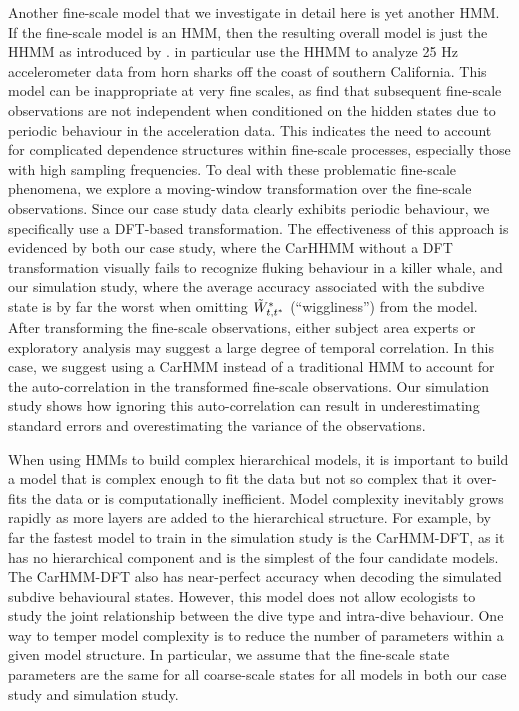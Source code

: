 Another fine-scale model that we investigate in detail here is yet another HMM. If the fine-scale model is an HMM, then the resulting overall model is just the HHMM as introduced by \citet{Barajas:2017}. \citet{Adam:2019} in particular use the HHMM to analyze 25 Hz accelerometer data from horn sharks off the coast of southern California. This model can be inappropriate at very fine scales, as \citet{Adam:2019} find that subsequent fine-scale observations are not independent when conditioned on the hidden states due to periodic behaviour in the acceleration data. This indicates the need to account for complicated dependence structures within fine-scale processes, especially those with high sampling frequencies. To deal with these problematic fine-scale phenomena, we explore a moving-window transformation over the fine-scale observations. Since our case study data clearly exhibits periodic behaviour, we specifically use a DFT-based transformation. The effectiveness of this approach is evidenced by both our case study, where the CarHHMM without a DFT transformation visually fails to recognize fluking behaviour in a killer whale, and our simulation study, where the average accuracy associated with the subdive state is by far the worst when omitting $\tilde{W}^*_{t,t^*}$ (``wiggliness'') from the model. After transforming the fine-scale observations, either subject area experts or exploratory analysis may suggest a large degree of temporal correlation. In this case, we suggest using a CarHMM instead of a traditional HMM to account for the auto-correlation in the transformed fine-scale observations. Our simulation study shows how ignoring this auto-correlation can result in underestimating standard errors and overestimating the variance of the observations. 

When using HMMs to build complex hierarchical models, it is important to build a model that is complex enough to fit the data but not so complex that it over-fits the data or is computationally inefficient. Model complexity inevitably grows rapidly as more layers are added to the hierarchical structure. For example, by far the fastest model to train in the simulation study is the CarHMM-DFT, as it has no hierarchical component and is the simplest of the four candidate models. The CarHMM-DFT also has near-perfect accuracy when decoding the simulated subdive behavioural states. However, this model does not allow ecologists to study the joint relationship between the dive type and intra-dive behaviour. One way to temper model complexity is to reduce the number of parameters within a given model structure. In particular, we assume that the fine-scale state parameters are the same for all coarse-scale states for all models in both our case study and simulation study.

